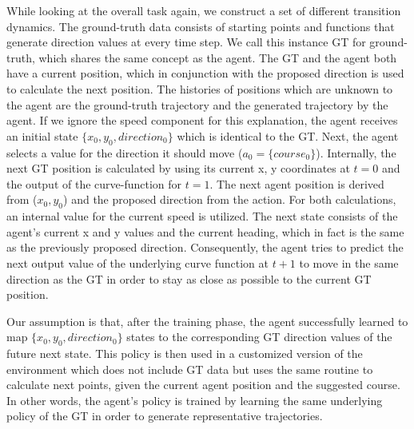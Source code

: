 While looking at the overall task again, we construct a set of different transition dynamics. The ground-truth data consists of starting points and functions that generate direction values at every time step. We call this instance GT for ground-truth, which shares the same concept as the agent. The GT and the agent both have a current position, which in conjunction with the proposed direction is used to calculate the next position. The histories of positions which are unknown to the agent are the ground-truth trajectory and the generated trajectory by the agent. If we ignore the speed component for this explanation, the agent receives an initial state $\{x_0,y_0,direction_0\}$ which is identical to the GT. Next, the agent selects a value for the direction it should move ($a_0=\{course_0\}$). Internally, the next GT position is calculated by using its current x, y coordinates at $t=0$ and the output of the curve-function for $t=1$. The next agent position is derived from ($x_0, y_0$) and the proposed direction from the action. For both calculations, an internal value for the current speed is utilized. The next state consists of the agent's current x and y values and the current heading, which in fact is the same as the previously proposed direction. Consequently, the agent tries to predict the next output value of the underlying curve function at $t+1$ to move in the same direction as the GT in order to stay as close as possible to the current GT position.
\par
Our assumption is that, after the training phase, the agent successfully learned to map $\{x_0,y_0,direction_0\}$ states to the corresponding GT direction values of the future next state. This policy is then used in a customized version of the environment which does not include GT data but uses the same routine to calculate next points, given the current agent position and the suggested course. In other words, the agent's policy is trained by learning the same underlying policy of the GT in order to generate representative trajectories.
\par
